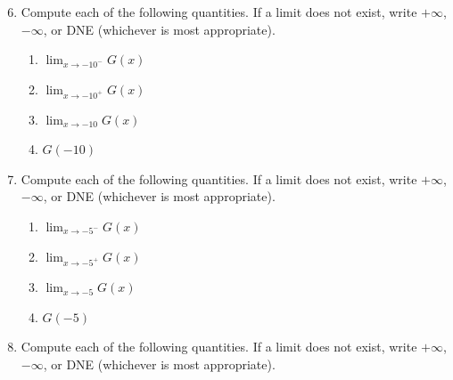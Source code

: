 \documentclass[12pt]{article}
\newif\ifans
\begin{document}
\begin{enumerate}
\setcounter{enumi}{5}

\item Compute each of the following quantities.  If a limit does not exist, write $+\infty$, $-\infty$, or DNE (whichever is most appropriate). 

\begin{enumerate}

\item $\displaystyle \lim_{x \rightarrow -10^{-}}{G(x)}$

\ifans{\fbox{$8$}} \fi

\item $\displaystyle \lim_{x \rightarrow -10^{+}}{G(x)}$

\ifans{\fbox{$8$}} \fi

\item $\displaystyle \lim_{x \rightarrow -10}{G(x)}$

\ifans{\fbox{$8$}} \fi

\item $G(-10)$

\ifans{\fbox{$4$}} \fi

\end{enumerate}

\item Compute each of the following quantities.  If a limit does not exist, write $+\infty$, $-\infty$, or DNE (whichever is most appropriate). 

\begin{enumerate}

\item $\displaystyle \lim_{x \rightarrow -5^{-}}{G(x)}$

\ifans{\fbox{$3$}} \fi

\item $\displaystyle \lim_{x \rightarrow -5^{+}}{G(x)}$

\ifans{\fbox{$-4$}} \fi

\item $\displaystyle \lim_{x \rightarrow -5}{G(x)}$

\ifans{\fbox{DNE because $\displaystyle \lim_{x \rightarrow -5^{-}}{G(x)} \neq \lim_{x \rightarrow -5^{+}}{G(x)}$}} \fi

\item $G(-5)$

\ifans{\fbox{Undefined}} \fi

\end{enumerate}

\item Compute each of the following quantities.  If a limit does not exist, write $+\infty$, $-\infty$, or DNE (whichever is most appropriate). 


\end{enumerate}
\end{document}
